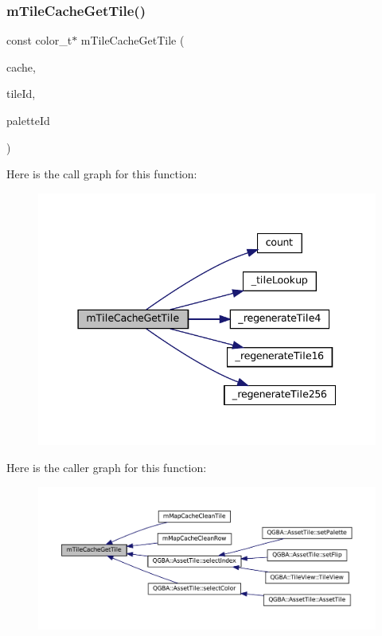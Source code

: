 \subsubsection{\texorpdfstring{m\+Tile\+Cache\+Get\+Tile()}{mTileCacheGetTile()}}
{\footnotesize\ttfamily const color\+\_\+t$\ast$ m\+Tile\+Cache\+Get\+Tile (\begin{DoxyParamCaption}\item[{struct m\+Tile\+Cache $\ast$}]{cache,  }\item[{unsigned}]{tile\+Id,  }\item[{unsigned}]{palette\+Id }\end{DoxyParamCaption})}

Here is the call graph for this function\+:
\nopagebreak
\begin{figure}[H]
\begin{center}
\leavevmode
\includegraphics[width=337pt]{tile-cache_8c_a095b4a1a63027962105a30a6197db22d_cgraph}
\end{center}
\end{figure}
Here is the caller graph for this function\+:
\nopagebreak
\begin{figure}[H]
\begin{center}
\leavevmode
\includegraphics[width=350pt]{tile-cache_8c_a095b4a1a63027962105a30a6197db22d_icgraph}
\end{center}
\end{figure}
\mbox{\label{tile-cache_8c_ac03a3bf273a14e0a825221dce2343a9d}} 
